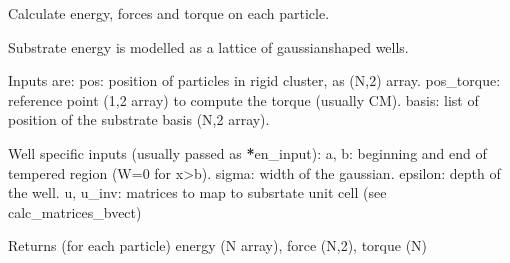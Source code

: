 \documentclass[letterpaper,10pt,english]{sphinxmanual}
\begin{document}
\begin{fulllineitems}
\label{\detokenize{tool_create_substrate:tool_create_substrate.particle_en_gaussian}}
\pysigstartsignatures
{}
\pysigstopsignatures
\sphinxAtStartPar
Calculate energy, forces and torque on each particle.

\sphinxAtStartPar
Substrate energy is modelled as a lattice of gaussian\sphinxhyphen{}shaped wells.

\sphinxAtStartPar
Inputs are:
\sphinxhyphen{} pos: position of particles in rigid cluster, as (N,2) array.
\sphinxhyphen{} pos\_torque: reference point (1,2 array) to compute the torque (usually CM).
\sphinxhyphen{} basis: list of position of the substrate basis (N,2 array).

\sphinxAtStartPar
Well specific inputs (usually passed as {\color{red}\bfseries{}*}en\_input):
\sphinxhyphen{} a, b: beginning and end of tempered region (W=0 for x\textgreater{}b).
\sphinxhyphen{} sigma: width of the gaussian.
\sphinxhyphen{} epsilon: depth of the well.
\sphinxhyphen{} u, u\_inv: matrices to map to subsrtate unit cell (see calc\_matrices\_bvect)

\sphinxAtStartPar
Returns (for each particle) energy (N array), force (N,2), torque (N)

\end{fulllineitems}

\end{document}
